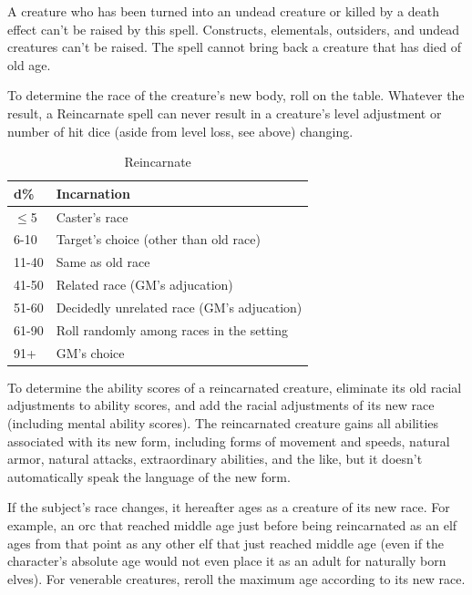 A creature who has been turned into an undead creature or killed by a death effect can't be raised by this spell. 
Constructs, elementals, outsiders, and undead creatures can't be raised. 
The spell cannot bring back a creature that has died of old age.

To determine the race of the creature's new body, roll on the  table.
Whatever the result, a Reincarnate spell can never result in a creature's level adjustment or number of hit dice
(aside from level loss, see above) changing.
\begin{table}
\caption{Reincarnate}
\label{tab:Reincarnate}
\begin{center}
\begin{tabular}{|l|l|}
\hline
d\%&Incarnation\\
\hline
$\leq$5&Caster's race\\
6-10&Target's choice (other than old race)\\
11-40&Same as old race\\
41-50&Related race (GM's adjucation)\\
51-60&Decidedly unrelated race (GM's adjucation)\\
61-90&Roll randomly among races in the setting\\
91+&GM's choice\\
\hline
\end{tabular}
\end{center}
\end{table}
To determine the ability scores of a reincarnated creature, eliminate its old racial adjustments to ability scores,
and add the racial adjustments of its new race (including mental ability scores).
The reincarnated creature gains all abilities associated with its new form, 
including forms of movement and speeds, natural armor, natural attacks, extraordinary abilities, and the like, 
but it doesn't automatically speak the language of the new form. 

If the subject's race changes, it hereafter ages as a creature of its new race.
For example, an orc that reached middle age just before being reincarnated as an elf ages from that point as any other elf
that just reached middle age (even if the character's absolute age would not even place it as an adult for naturally born elves).
For venerable creatures, reroll the maximum age according to its new race.

